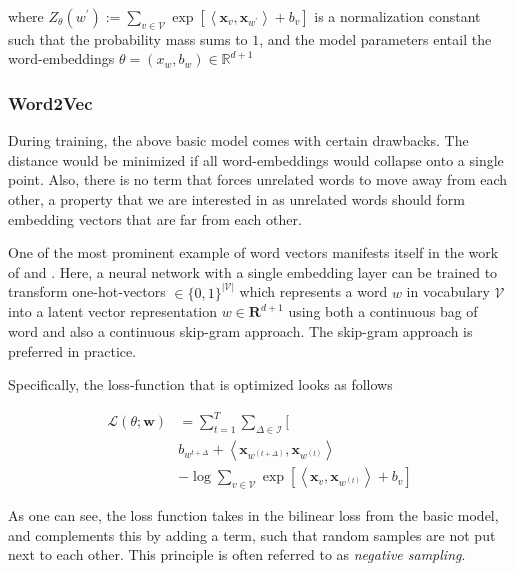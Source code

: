 \documentclass[a4paper,12pt,twoside,openright]{report}
\begin{document}
where $Z_{\theta}\left(w^{\prime}\right):=\sum_{v \in \mathcal{V}} \exp \left[\left\langle\mathbf{x}_{v}, \mathbf{x}_{w^{\prime}}\right\rangle+b_{v}\right]$ is a normalization constant such that the probability mass sums to $1$, and the model parameters entail the word-embeddings $\theta = (x_w, b_w) \in \mathbb{R}^{d+1}$



\subsubsection{Word2Vec}


During training, the above basic model comes with certain drawbacks. The distance would be minimized if all word-embeddings would collapse onto a single point. 
Also, there is no term that forces unrelated words to move away from each other, a property that we are interested in as unrelated words should form embedding vectors that are far from each other.

One of the most prominent example of word vectors manifests itself in the work of \cite{mikolov13} and \cite{mikolov13b}.
Here, a neural network with a single embedding layer can be trained to transform one-hot-vectors $\in \{ 0, 1 \}^{| \mathcal{V} |}$ which represents a word $w$ in vocabulary $\mathcal{V}$
into a latent vector representation $w \in \mathbf{R}^{d + 1}$ using both a continuous bag of word and also a continuous skip-gram approach.
The skip-gram approach is preferred in practice.

Specifically, the loss-function that is optimized looks as follows

\begin{align} 
\mathcal{L}(\theta ; \mathbf{w}) & =\sum_{t=1}^{T} \sum_{\Delta \in \mathcal{I}} [\\ 
& b_{w^{t+\Delta}} +\left\langle \mathbf{x}_{w^{(t+\Delta)}}, \mathbf{x}_{w^{(t)}} \right\rangle \\
& -\log \sum_{v \in \mathcal{V}} \exp \left[\left\langle\mathbf{x}_{v}, \mathbf{x}_{w^{(t)}}\right\rangle+b_{v} \right] 
\end{align}

As one can see, the loss function takes in the bilinear loss from the basic model, and complements this by adding a term, such that random samples are not put next to each other.
This principle is often referred to as \textit{negative sampling}.
\end{document}
